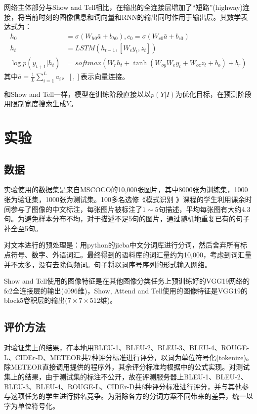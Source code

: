 \documentclass[10pt,a4paper,UTF8]{ctexart}
\begin{document}
\begin{spacing}{1.5}
		网络主体部分与Show and Tell相比，在输出的全连接层增加了“短路”(highway)连接，将当前时刻的图像信息和词向量和RNN的输出同时作用于输出层。其数学表达式为：
		\begin{align}
		h_0&=\sigma(W_{h0}\bar{a}+b_{h0}), c_0=\sigma(W_{c0}\bar{a}+b_{c0})\\
		h_t&=LSTM(h_{t-1},\left[ W_ey_t,z_t \right]) \\
		\log p(y_{t+1}|h_t)&=softmax(W_rh_t+\tanh(W_{oy}W_ey_t+W_{oz}z_t+b_o)+b_r)
		\end{align}
		其中$\bar{a}=\frac{1}{L}\sum_{i=1}^L a_i$，$\left[,\right]$表示向量连接。
		
		和Show and Tell一样，模型在训练阶段直接以以$p(Y|I)$为优化目标，在预测阶段用限制宽度搜索生成$Y$。
		
		\section{实验}
		
		\subsection{数据}
		
		实验使用的数据集是来自MSCOCO的10,000张图片，其中8000张为训练集，1000张为验证集，1000张为测试集。100多名选修《模式识别 》课程的学生利用课余时间参与了图像的中文标注，每张图片被标注了$1\sim5$句描述，平均每张图有大约4.3句。为避免样本分布不均，对于描述不足5句的图片，通过随机地重复已有的句子补全至5句。
		
		对文本进行的预处理是：用python的jieba中文分词库进行分词，然后舍弃所有标点符号、数字、外语词汇。最终得到的语料库的词汇量约为10,000，考虑到词汇量并不太多，没有去除低频词。句子将以词序号序列的形式输入网络。
		
		Show and Tell使用的图像特征是在其他图像分类任务上预训练好的VGG19网络的fc2全连接层的输出(4096维)，Show, Attend and Tell使用的图像特征是VGG19的block5卷积层的输出($7\times7\times512$维)。
		
		\subsection{评价方法}
		
		对验证集上的结果，在本地用BLEU-1、BLEU-2、BLEU-3、BLEU-4、ROUGE-L、CIDEr-D、METEOR共7种评分标准进行评分，以词为单位符号化(tokenize)。除METEOR直接调用\cite{meteor}提供的程序外，其余评分标准均根据\cite{eval}中的公式实现。对测试集上的结果，由于测试集的标注不公开，故在评测服务器上BLEU-1、BLEU-2、BLEU-3、BLEU-4、ROUGE-L、CIDEr-D共6种评分标准进行评分，并与其他参与这项任务的学生进行排名竞争。为消除各方的分词方案不同带来的差异，统一以字为单位符号化。
		

\end{spacing}
\end{document}

